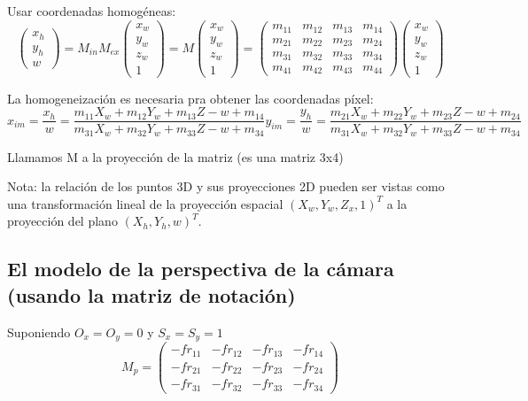 Usar coordenadas homogéneas:
\begin{equation}
\begin{pmatrix}x_{h}\\y_{h}\\w \end{pmatrix}=M_{in}M_{ex}\begin{pmatrix}x_{w}\\y_{w}\\z_{w}\\1 \end{pmatrix}=M\begin{pmatrix}x_{w}\\y_{w}\\z_{w}\\1 \end{pmatrix}=\begin{pmatrix}m_{11} &m_{12} & m_{13} & m_{14}\\m_{21} & m_{22} & m_{23} & m_{24}\\m_{31} & m_{32} & m_{33} & m_{34}\\m_{41} & m_{42} & m_{43} & m_{44}\end{pmatrix}\begin{pmatrix}x_{w}\\y_{w}\\z_{w}\\1 \end{pmatrix}
\end{equation}

La homogeneización es necesaria pra obtener las coordenadas píxel:
\begin{equation}
x_{im}=\frac{x_h}{w}=\frac{m_{11}X_w+m_{12}Y_w+m_{13}Z-w+m_{14}}{m_{31}X_w+m_{32}Y_w+m_{33}Z-w+m_{34}}
y_{im}=\frac{y_h}{w}=\frac{m_{21}X_w+m_{22}Y_w+m_{23}Z-w+m_{24}}{m_{31}X_w+m_{32}Y_w+m_{33}Z-w+m_{34}}
\end{equation}

Llamamos M a la proyección de la matriz (es una matriz 3x4)

Nota: la relación de los puntos 3D y sus proyecciones 2D pueden ser vistas como una transformación lineal de la proyección espacial $({X_w}, {Y_w}, {Z_x}, 1)^T$ a la proyección del plano $({X_h}, {Y_h}, w)^T$.

\subsection{El modelo de la perspectiva de la cámara (usando la matriz de notación)}

Suponiendo  $O_x=O_y=0$ y $S_x=S_y=1$
\begin{equation}
M_p=\begin{pmatrix}-fr_{11} & -fr_{12} & -fr_{13} & -fr_{14}\\-fr_{21} & -fr_{22} & -fr_{23} & -fr_{24}\\ -fr_{31} & -fr_{32} & -fr_{33} & -fr_{34}\end{pmatrix}
\end{equation}

